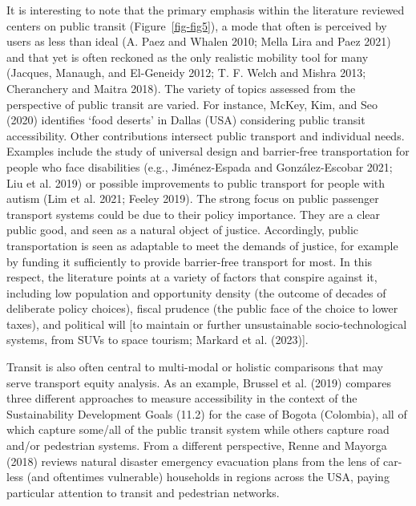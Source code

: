 \documentclass[12pt, oneside]{report}
\begin{document}
It is interesting to note that the primary emphasis within the
literature reviewed centers on public transit (Figure~\ref{fig-fig5}), a
mode that often is perceived by users as less than ideal (A. Paez and
Whalen 2010; Mella Lira and Paez 2021) and that yet is often reckoned as
the only realistic mobility tool for many (Jacques, Manaugh, and
El-Geneidy 2012; T. F. Welch and Mishra 2013; Cheranchery and Maitra
2018). The variety of topics assessed from the perspective of public
transit are varied. For instance, McKey, Kim, and Seo (2020) identifies
`food deserts' in Dallas (USA) considering public transit accessibility.
Other contributions intersect public transport and individual needs.
Examples include the study of universal design and barrier-free
transportation for people who face disabilities (e.g., Jiménez-Espada
and González-Escobar 2021; Liu et al. 2019) or possible improvements to
public transport for people with autism (Lim et al. 2021; Feeley 2019).
The strong focus on public passenger transport systems could be due to
their policy importance. They are a clear public good, and seen as a
natural object of justice. Accordingly, public transportation is seen as
adaptable to meet the demands of justice, for example by funding it
sufficiently to provide barrier-free transport for most. In this
respect, the literature points at a variety of factors that conspire
against it, including low population and opportunity density (the
outcome of decades of deliberate policy choices), fiscal prudence (the
public face of the choice to lower taxes), and political will {[}to
maintain or further unsustainable socio-technological systems, from SUVs
to space tourism; Markard et al. (2023){]}.

Transit is also often central to multi-modal or holistic comparisons
that may serve transport equity analysis. As an example, Brussel et al.
(2019) compares three different approaches to measure accessibility in
the context of the Sustainability Development Goals (11.2) for the case
of Bogota (Colombia), all of which capture some/all of the public
transit system while others capture road and/or pedestrian systems. From
a different perspective, Renne and Mayorga (2018) reviews natural
disaster emergency evacuation plans from the lens of car-less (and
oftentimes vulnerable) households in regions across the USA, paying
particular attention to transit and pedestrian networks.
\end{document}
